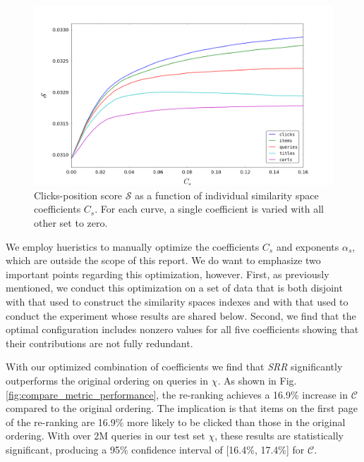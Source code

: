 \documentclass{article}
\begin{document}
\begin{figure}[htbp!]
    \centering
    \includegraphics[width=\textwidth]{000050_0_48chunk_k100_i2_n100_avg_click_position_score_0-0_16.png}
    \caption{Clicks-position score $\mathscr{S}$ as a function of individual similarity space coefficients $C_s$. For each curve, a single coefficient is varied with all other set to zero.}
    \label{fig:avg_clicks_position_score}
\end{figure}

We employ hueristics to manually optimize the coefficients $C_s$ and exponents
$\alpha_s$, which are outside the scope of this report. We do want to emphasize
two important points regarding this optimization, however. First, as previously
mentioned, we conduct this optimization on a set of data that is both disjoint
with that used to construct the similarity spaces indexes and with that used to
conduct the experiment whose results are shared below. Second, we find that the
optimal configuration includes nonzero values for all five coefficients showing
that their contributions are not fully redundant.

With our optimized combination of coefficients we find that {\em SRR}
significantly outperforms the original ordering on queries in $\chi$. As shown
in Fig.  \ref{fig:compare_metric_performance}, the re-ranking achieves a 16.9\%
increase in $\mathscr{C}$ compared to the original ordering. The implication is
that items on the first page of the re-ranking are 16.9\% more likely to be
clicked than those in the original ordering. With over 2M queries in our test set
$\chi$, these results are statistically significant, producing a 95\%
confidence interval of [16.4\%, 17.4\%] for $\mathscr{C}$.
\end{document}
